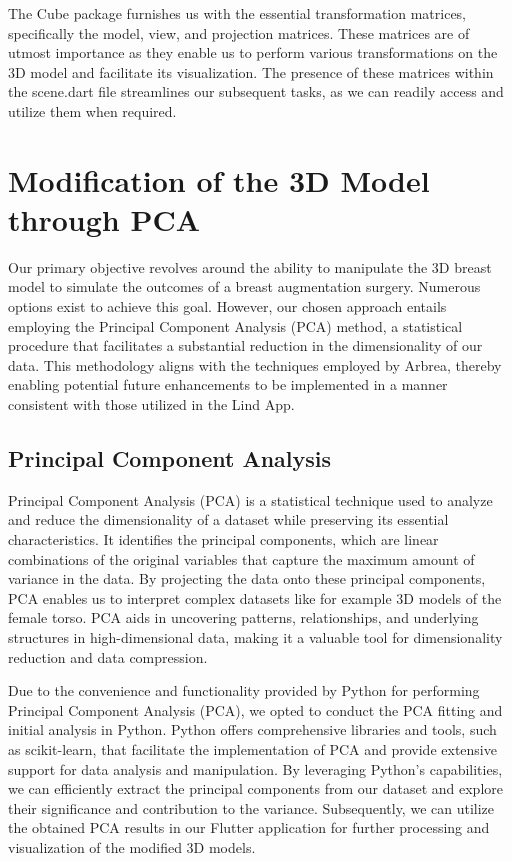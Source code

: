 The Cube package furnishes us with the essential transformation matrices, specifically the model, view, and projection matrices. 
These matrices are of utmost importance as they enable us to perform various transformations on the 3D model and facilitate its visualization. 
The presence of these matrices within the scene.dart file streamlines our subsequent tasks, as we can readily access and utilize them when required.

\section{Modification of the 3D Model through PCA}\label{sec:modification}

Our primary objective revolves around the ability to manipulate the 3D breast model to simulate the outcomes of a breast augmentation surgery. 
Numerous options exist to achieve this goal. However, our chosen approach entails employing the Principal Component Analysis (PCA) method, 
a statistical procedure that facilitates a substantial reduction in the dimensionality of our data. This methodology aligns with the techniques employed by Arbrea, 
thereby enabling potential future enhancements to be implemented in a manner consistent with those utilized in the Lind App.

\subsection{Principal Component Analysis}

Principal Component Analysis (PCA) is a statistical technique used to analyze and reduce the dimensionality of a dataset while preserving its essential characteristics. 
It identifies the principal components, which are linear combinations of the original variables that capture the maximum amount of variance in the data. 
By projecting the data onto these principal components, PCA enables us to interpret complex datasets like for example 3D models of the female torso. PCA aids in uncovering patterns, 
relationships, and underlying structures in high-dimensional data, making it a valuable tool for dimensionality reduction and data compression.

Due to the convenience and functionality provided by Python for performing Principal Component Analysis (PCA), we opted to conduct the PCA fitting and initial analysis in Python. 
Python offers comprehensive libraries and tools, such as scikit-learn, that facilitate the implementation of PCA and provide extensive support for data analysis and manipulation. 
By leveraging Python's capabilities, we can efficiently extract the principal components from our dataset and explore their significance and contribution to the variance. 
Subsequently, we can utilize the obtained PCA results in our Flutter application for further processing and visualization of the modified 3D models.

